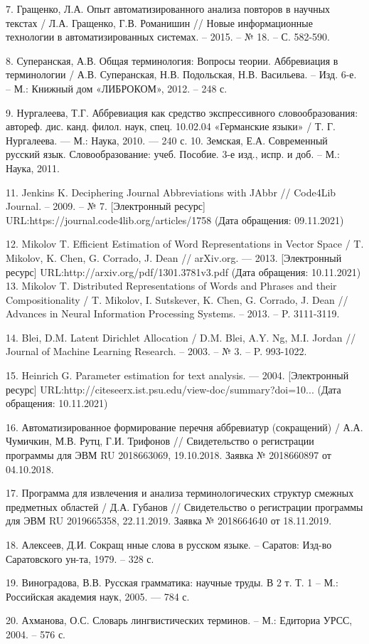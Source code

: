 \documentclass[a4paper]{article}
\begin{document}
7. Гращенко, Л.А. Опыт автоматизированного анализа повторов в научных текстах / Л.А. Гращенко, Г.В. Романишин // Новые информационные технологии в автоматизированных системах. – 2015. – № 18. – С. 582-590.

8. Суперанская, А.В. Общая терминология: Вопросы теории. Аббревиация в терминологии / А.В. Суперанская, Н.В. Подольская, Н.В. Васильева. – Изд. 6-е. – М.: Книжный дом «ЛИБРОКОМ», 2012. – 248 с.

9. Нургалеева, Т.Г. Аббревиация как средство экспрессивного словообразования: автореф. дис. канд. филол. наук, спец. 10.02.04 «Германские языки» / Т. Г. Нургалеева. — М.: Наука, 2010. — 240 с.
10. Земская, Е.А. Современный русский язык. Словообразование: учеб. Пособие. 3-е изд., испр. и доб. – М.: Наука, 2011.

11. Jenkins K. Deciphering Journal Abbreviations with JAbbr // Code4Lib Journal. – 2009. – № 7. [Электронный ресурс] URL:https://journal.code4lib.org/articles/1758 (Дата обращения: 09.11.2021)

12. Mikolov T. Efficient Estimation of Word Representations in Vector Space / T. Mikolov, K. Chen, G. Corrado, J. Dean // arXiv.org. — 2013. [Электронный ресурс] URL:http://arxiv.org/pdf/1301.3781v3.pdf (Дата обращения: 10.11.2021)
13. Mikolov T. Distributed Representations of Words and Phrases and their Compositionality / T. Mikolov, I. Sutskever, K. Chen, G. Corrado, J. Dean // Advances in Neural Information Processing Systems. – 2013. – P. 3111-3119.

14. Blei, D.M. Latent Dirichlet Allocation / D.M. Blei, A.Y. Ng, M.I. Jordan // Journal of Machine Learning Research. – 2003. – № 3. – P. 993-1022.

15. Heinrich G. Parameter estimation for text analysis. — 2004. [Электронный ресурс] URL:http://citeseerx.ist.psu.edu/view-doc/summary?doi=10... (Дата обращения: 10.11.2021)

16. Автоматизированное формирование перечня аббревиатур (сокращений) / А.А. Чумичкин, М.В. Рутц, Г.И. Трифонов // Свидетельство о регистрации программы для ЭВМ RU 2018663069, 19.10.2018. Заявка № 2018660897 от 04.10.2018.

17. Программа для извлечения и анализа терминологических структур смежных предметных областей / Д.А. Губанов // Свидетельство о регистрации программы для ЭВМ RU 2019665358, 22.11.2019. Заявка № 2018664640 от 18.11.2019.

18. Алексеев, Д.И. Сокращ нные слова в русском языке. – Саратов: Изд-во Саратовского ун-та, 1979. – 328 с.

19. Виноградова, В.В. Русская грамматика: научные труды. В 2 т. Т. 1 – М.: Российская академия наук, 2005. — 784 с.

20. Ахманова, О.С. Словарь лингвистических терминов. – М.: Едиториа УРСС, 2004. – 576 с.
\end{document}
